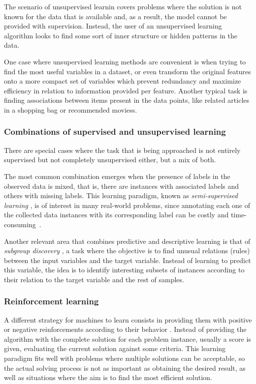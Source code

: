 The scenario of unsupervised learnin  covers problems where the solution is not known for the data that is available and, as a result, the model cannot be provided with supervision. Instead, the user of an unsupervised learning algorithm looks to find some sort of inner structure or hidden patterns in the data.

One case where unsupervised learning methods are convenient is when trying to find the most useful variables in a dataset, or even transform the original features onto a more compact set of variables which prevent redundancy and maximize efficiency in relation to information provided per feature. Another typical task is finding associations between items present in the data points, like related articles in a shopping bag or recommended moviess. 

\subsubsection{Combinations of supervised and unsupervised learning}

There are special cases where the task that is being approached is not entirely supervised but not completely unsupervised either, but a mix of both.

The most common combination emerges when the presence of labels in the observed data is mixed, that is, there are instances with associated labels and others with missing labels. This learning paradigm, known as \textit{semi-supervised learning} , is of interest in many real-world problems, since annotating each one of the collected data instances with its corresponding label can be costly and time-consuming~. 

Another relevant area that combines predictive and descriptive learning is that of \textit{subgroup discovery} \cite{Herrera2010AnOO}, a task where the objective is to find unusual relations (rules) between the input variables and the target variable. Instead of learning to predict this variable, the idea is to identify interesting subsets of instances according to their relation to the target variable and the rest of samples.

\subsubsection{Reinforcement learning}

A different strategy for machines to learn consists in providing them with positive or negative reinforcements according to their behavior . Instead of providing the algorithm with the complete solution for each problem instance, usually a score is given, evaluating the current solution against some criteria. This learning paradigm fits well with problems where multiple solutions can be acceptable, so the actual solving process is not as important as obtaining the desired result, as well as situations where the aim is to find the most efficient solution.

